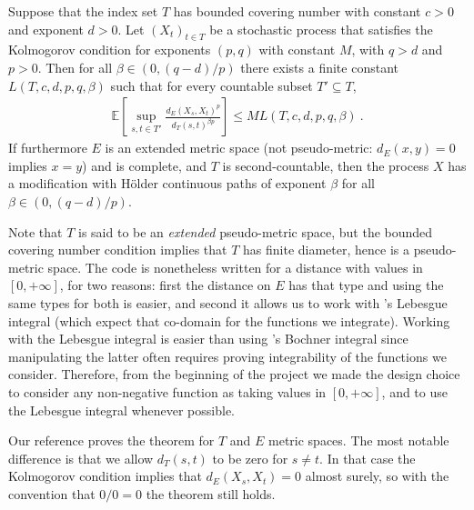 \documentclass[lean]{Draft}
\begin{document}
\begin{theorem}\label{thm:kolmogorov_chentsov}
Suppose that the index set $T$ has bounded covering number with constant $c>0$ and exponent $d > 0$.
Let $(X_t)_{t \in T}$ be a stochastic process that satisfies the Kolmogorov condition for exponents $(p,q)$ with constant $M$, with $q > d$ and $p > 0$.
Then for all $\beta \in(0, (q - d)/p)$ there exists a finite constant $L(T, c, d, p, q, \beta)$ such that for every countable subset $T' \subseteq T$,
\begin{align*}
  \mathbb{E}\left[ \sup_{s, t \in T'} \frac{d_E(X_s, X_t)^p}{d_T(s, t)^{\beta p}} \right]
  \le M L(T, c, d, p, q, \beta)
  \: .
\end{align*}
If furthermore $E$ is an extended metric space (not pseudo-metric: $d_E(x,y) = 0$ implies $x = y$) and is complete, and $T$ is second-countable, then the process $X$ has a modification with Hölder continuous paths of exponent $\beta$ for all $\beta \in (0, (q - d)/p)$.
\end{theorem}



Note that $T$ is said to be an \emph{extended} pseudo-metric space, but the bounded covering number condition implies that $T$ has finite diameter, hence is a pseudo-metric space.
The \Lean code is nonetheless written for a distance with values in $[0,+\infty]$, for two reasons: first the distance on $E$ has that type and using the same types for both is easier, and second it allows us to work with \mathlib's Lebesgue integral (which expect that co-domain for the functions we integrate).
Working with the Lebesgue integral is easier than using \mathlib's Bochner integral since manipulating the latter often requires proving integrability of the functions we consider.
Therefore, from the beginning of the project we made the design choice to consider any non-negative function as taking values in $[0,+\infty]$, and to use the Lebesgue integral whenever possible.

Our reference \cite{kratschmer2023kolmogorov} proves the theorem for $T$ and $E$ metric spaces.
The most notable difference is that we allow $d_T(s, t)$ to be zero for $s \ne t$.
In that case the Kolmogorov condition implies that $d_E(X_s, X_t) = 0$ almost surely, so with the convention that $0/0 = 0$ the theorem still holds.
\end{document}
